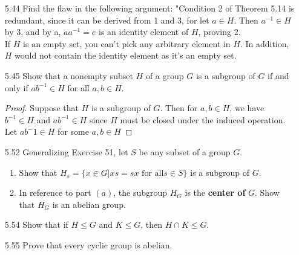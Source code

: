 \documentclass[12pt]{article}
\begin{document}
\begin{enumerate}
\begin{proof}
			Therefore,$ \phi[H]$ is a subgroup of $ G' $ 
		\end{proof}
		\item[5.44] Find the flaw in the following argument: "Condition 2 of Theorem 5.14 is redundant, since it can be derived from 1 and 3, for let $a \in H$. Then $a^{-1}\in H$ by 3, and by a, $aa^{-1} = e$ is an identity element of $H$, proving 2.\\
		If $ H $ is an empty set, you can't pick any arbitrary element in $ H $. In addition, $ H $ would not contain the identity element as it's an empty set.
		\item[5.45] Show that a nonempty subset $H$ of a group $G$ is a subgroup of $G$ if and only if $ab^{-1}\in H$ for all $a,b \in H$.
			\begin{proof}
				Suppose that $ H $ is a subgroup of $ G $. Then for $ a,b\in H $, we have $ b^{-1}\in H $ and $ ab^{-1}\in H $ since $ H $ must be closed under the induced operation.\\
				Let $ ab^-1\in H $ for some $ a,b\in H $
			\end{proof}
		\item[5.52] Generalizing Exercise 51, let $S$ be any subset of a group $G$.
		
		\begin{enumerate}
			\item Show that $H_s = \{x \in G|xs = sx \text{ for all} s \in S\}$ is a subgroup of $G$. 
			\item In reference to part $(a)$, the subgroup $H_G$ is the \textbf{center of} $G$. Show that $H_G$ is an abelian group.
		\end{enumerate}
		
		\item[5.54] Show that if $H \leq G$ and $K \leq G$, then $H\cap K \leq G$.
		\item[5.55] Prove that every cyclic group is abelian.
		
	\end{enumerate}
\end{document}
